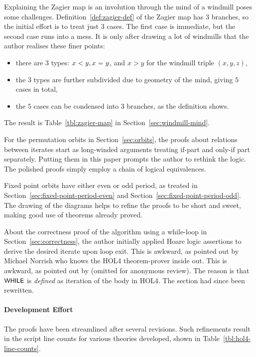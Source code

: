 \documentclass[sigplan,screen]{acmart}
\newcommand{\m}[1]{\todo[fancyline,color=blue!40,size=\scriptsize]{\textsf{JC: #1}}} %
\newcommand{\ee}{\ \HOLConst{=}\ } %
\renewcommand{\HOLinline}[1]{\ensuremath{#1}} %
\renewcommand{\HOLConst}[1]{{\fontsize{9pt}{1em}\selectfont\textsf{\upshape #1}}}
\begin{document}
Explaining the Zagier map is an involution through the mind of a windmill poses some challenges. Definition~\ref{def:zagier-def} of the Zagier map has $3$ branches, so the initial effort is to treat just $3$ cases. The first case is immediate, but the second case runs into a mess. It is only after drawing a lot of windmills that the author realises these finer points:
\begin{itemize}[leftmargin=*] %
\item there are $3$ types: $x < y, x \ee y$, and $x > y$ for the windmill triple $(x,y,z)$,
\item the $3$ types are further subdivided due to geometry of the mind, giving $5$ cases in total,
\item the $5$ cases can be condensed into $3$ branches, as the definition shows.
\end{itemize}
The result is Table~\ref{tbl:zagier-map} in Section~\ref{sec:windmill-mind}.

For the permutation orbits in Section~\ref{sec:orbits},
the proofs about relations between iterates start as long-winded arguments treating if-part and only-if part separately.
Putting them in this paper prompts the author to rethink the logic.
The polished proofs simply employ a chain of logical equivalences.

Fixed point orbits have either even or odd period, as treated in Section~\ref{sec:fixed-point-period-even} and Section~\ref{sec:fixed-point-period-odd}. 
The drawing of the diagrams helps to refine the proofs to be short and sweet, making good use of theorems already proved.

About the correctness proof of the algorithm using a while-loop in Section~\ref{sec:correctness}, the author initially applied Hoare logic assertions to derive the desired iterate upon loop exit.
\ifdefined\READY
This is awkward, as pointed out by Michael Norrish who knows the HOL4 theorem-prover inside out.
\else
This is awkward, as pointed out by (omitted for anonymous review).
\fi
The reason is that \HOLinline{\HOLConst{WHILE}} is \emph{defined} as iteration of the body in HOL4.
The section had since been rewritten.

\paragraph*{Development Effort}
The proofs have been streamlined after several revisions.
Such refinements result in the script line counts for various theories developed, shown in Table~\ref{tbl:hol4-line-counts}.
\end{document}
